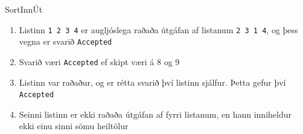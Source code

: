 \begin{problem}{Sort}{Inn}{Út}{~}{~}
	\Explanation

		\begin{enumerate}
			\item Listinn \texttt{1 2 3 4} er augljóslega raðaða útgáfan af listanum \texttt{2 3 1 4}, og þess vegna er svarið \texttt{Accepted}
			\item Svarið væri \texttt{Accepted} ef skipt væri á 8 og 9
			\item Listinn var raðaður, og er rétta svarið því listinn sjálfur. Þetta gefur því \texttt{Accepted}
			\item Seinni listinn er ekki raðaða útgáfan af fyrri listanum, en hann inniheldur ekki einu sinni sömu heiltölur
		\end{enumerate}

\end{problem}